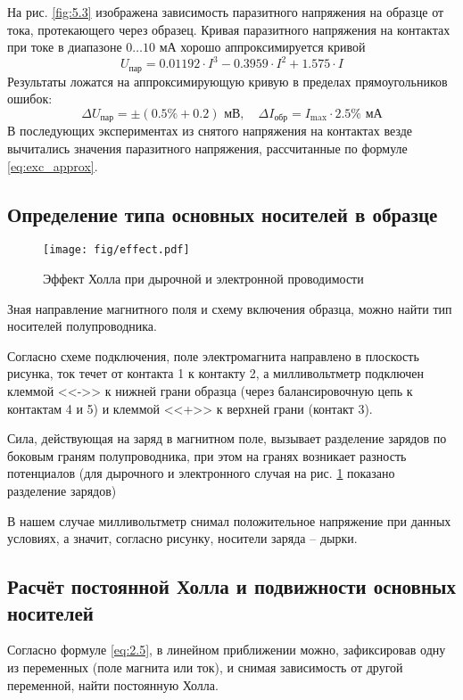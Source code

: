 \documentclass[a4paper,14pt]{extarticle}
\begin{document}
На рис. \ref{fig:5.3} изображена зависимость паразитного напряжения на образце от тока, протекающего через образец. Кривая паразитного напряжения на контактах при токе в диапазоне $0\ldots10$ мА хорошо аппроксимируется кривой
\begin{equation}
	\label{eq:exc_approx}
	U_\text{пар}=0.01192\cdot I^3 - 0.3959\cdot I^2 + 1.575\cdot I
\end{equation}
Результаты ложатся на аппроксимирующую кривую в пределах прямоугольников ошибок:
\begin{equation}
	\Delta U_\text{пар} = \pm (0.5\%+0.2) \text{ мВ}, \quad
	\Delta I_\text{обр} = I_{\max}\cdot 2.5\% \text{ мА}
\end{equation}
В последующих экспериментах из снятого напряжения на контактах везде вычитались значения паразитного напряжения, рассчитанные по формуле \eqref{eq:exc_approx}.


 




\subsection{Определение типа основных носителей в образце}

\begin{figure}[H]
	\centering
	\texttt{[image: fig/effect.pdf]}
	\caption{Эффект Холла при дырочной и электронной проводимости \cite{lit0}}
	\label{fig:hall}
\end{figure}

Зная направление магнитного поля и схему включения образца, можно найти тип носителей полупроводника.

Согласно схеме подключения, поле электромагнита направлено в плоскость рисунка, ток течет от контакта 1 к контакту 2, а милливольтметр подключен клеммой <<->> к нижней грани образца (через балансировочную цепь к контактам 4 и 5) и клеммой <<+>> к верхней грани (контакт 3). 

Сила, действующая на заряд в магнитном поле, вызывает разделение зарядов по боковым граням полупроводника, при этом на гранях возникает разность потенциалов (для дырочного и электронного случая на рис. \ref{fig:hall} показано разделение зарядов)

В нашем случае милливольтметр снимал положительное напряжение при данных условиях, а значит, согласно рисунку, носители заряда -- дырки.

\subsection{Расчёт постоянной Холла и подвижности основных носителей}
Согласно формуле \eqref{eq:2.5}, в линейном приближении можно, зафиксировав одну из переменных (поле магнита или ток), и снимая зависимость от другой переменной, найти постоянную Холла.
\end{document}
